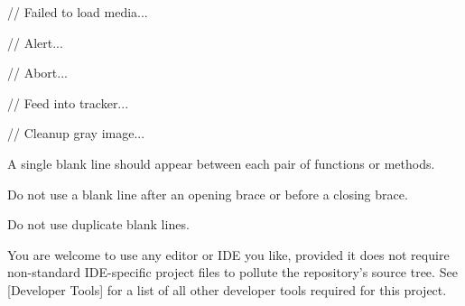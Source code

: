         // Failed to load media...

            // Alert...

            // Abort...

    // Feed into tracker...
    
    // Cleanup gray image...
\stopCodeExample

\item
A single blank line should appear between each pair of functions or methods. 

\item
Do not use a blank line after an opening brace or before a closing brace.

\item
Do not use duplicate blank lines.
\stopitemize


You are welcome to use any editor or IDE you like, provided it does not require non-standard IDE-specific project files to pollute the repository's source tree. See [Developer Tools] for a list of all other developer tools required for this project.


